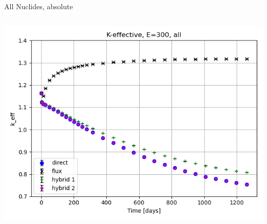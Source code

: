 \documentclass[
	11pt, %
	aspectratio=169, %
]{beamer}
\begin{document}
\begin{frame}{All Nuclides, absolute}
	\begin{columns}[c] %
		\begin{column}{0.39\textwidth}
			\includegraphics[width=\textwidth]{../figures/keff/keff_all_300.png}


\end{column}
\end{columns}
\end{frame}
\end{document}
